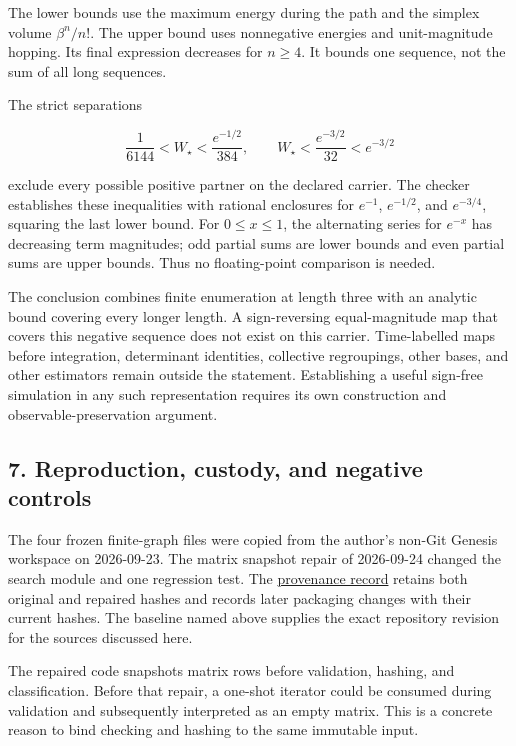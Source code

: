 \documentclass[
  11pt,
]{article}
\begin{document}
The lower bounds use the maximum energy during the path and the simplex
volume \(\beta^n/n!\). The upper bound uses nonnegative energies and
unit-magnitude hopping. Its final expression decreases for \(n\geq4\).
It bounds one sequence, not the sum of all long sequences.

The strict separations

\[
\frac1{6144}<W_\star<
\frac{e^{-1/2}}{384},\qquad
W_\star<\frac{e^{-3/2}}{32}<e^{-3/2}
\]

exclude every possible positive partner on the declared carrier. The
checker establishes these inequalities with rational enclosures for
\(e^{-1}\), \(e^{-1/2}\), and \(e^{-3/4}\), squaring the last lower
bound. For \(0\leq x\leq1\), the alternating series for \(e^{-x}\) has
decreasing term magnitudes; odd partial sums are lower bounds and even
partial sums are upper bounds. Thus no floating-point comparison is
needed.

The conclusion combines finite enumeration at length three with an
analytic bound covering every longer length. A sign-reversing
equal-magnitude map that covers this negative sequence does not exist on
this carrier. Time-labelled maps before integration, determinant
identities, collective regroupings, other bases, and other estimators
remain outside the statement. Establishing a useful sign-free simulation
in any such representation requires its own construction and
observable-preservation argument.

\subsection{7. Reproduction, custody, and negative
controls}\label{reproduction-custody-and-negative-controls}

The four frozen finite-graph files were copied from the author's non-Git
Genesis workspace on 2026-09-23. The matrix snapshot repair of
2026-09-24 changed the search module and one regression test. The
\href{https://github.com/dbccpage/the_symbol_game/blob/c819bec432446dd3c9b1edf1583384cfe76c6c71/atlas/coda_atlas/symbol_game/002_pfp_signed_presentations_and_search_frontier/code/PROVENANCE.md}{provenance
record} retains both original and repaired hashes and records later
packaging changes with their current hashes. The baseline named above
supplies the exact repository revision for the sources discussed here.

The repaired code snapshots matrix rows before validation, hashing, and
classification. Before that repair, a one-shot iterator could be
consumed during validation and subsequently interpreted as an empty
matrix. This is a concrete reason to bind checking and hashing to the
same immutable input.
\end{document}
